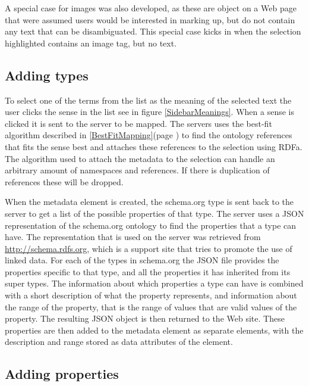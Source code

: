 A special case for images was also developed,
as these are object on a Web page that were assumed users would be interested in marking up,
but do not contain any text that can be disambiguated.
This special case kicks in when the selection highlighted contains an image tag, but no text.

\subsection{Adding types}

To select one of the terms from the list as the meaning of the selected text the user clicks the sense in the list see in
figure \ref{SidebarMeanings}.
When a sense is clicked it is sent to the server to be mapped.
The servers uses the best-fit algorithm described in \ref{BestFitMapping}(page \pageref{BestFitMapping}) to find the ontology references
that fits the sense best and attaches these references to the selection using RDFa.
The algorithm used to attach the metadata to the selection can handle an arbitrary amount of namespaces and references.
If there is duplication of references these will be dropped.

When the metadata element is created,
the schema.org type is sent back to the server to get a list of the possible properties of that type.
The server uses a JSON representation of the schema.org ontology to find the properties that a type can have.
The representation that is used on the server was retrieved from \url{http://schema.rdfs.org},
which is a support site that tries to promote the use of linked data.
For each of the types in schema.org the JSON file provides the properties specific to that type,
and all the properties it has inherited from its super types.
The information about which properties a type can have is combined with a short description of what the property represents,
and information about the range of the property, that is the range of values that are valid values of the property.
The resulting JSON object is then returned to the Web site.
These properties are then added to the metadata element as separate elements,
with the description and range stored as data attributes of the element.

\subsection{Adding properties}

